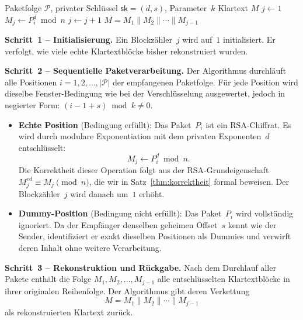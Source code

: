 ﻿\documentclass[12pt, a4paper]{article}
\theoremstyle{plain}
\theoremstyle{definition}
\theoremstyle{remark}
\newcommand{\sk}{\mathsf{sk}}
\begin{document}
\begin{algorithm}[h]
\caption{Fenster-Chiffre: Entschl\"usselung}
\label{alg:dec}
\begin{algorithmic}[1]
\Require Paketfolge $\mathcal{P}$, privater Schl\"ussel $\sk=(d,s)$, Parameter~$k$
\Ensure Klartext $M$
\State $j \gets 1$
    \State $M_j \gets P_i^d \bmod n$
    \State $j \gets j + 1$
  \EndIf
\EndFor
\State \Return $M = M_1 \| M_2 \| \cdots \| M_{j-1}$
\end{algorithmic}
\end{algorithm}

\medskip
\noindent\textbf{Schritt~1 -- Initialisierung.}
Ein Blockz\"ahler~$j$ wird auf~$1$ initialisiert. Er verfolgt, wie viele
echte Klartextbl\"ocke bisher rekonstruiert wurden.

\medskip
\noindent\textbf{Schritt~2 -- Sequentielle Paketverarbeitung.}
Der Algorithmus durchl\"auft alle Positionen $i = 1, 2, \ldots, |\mathcal{P}|$
der empfangenen Paketfolge. F\"ur jede Position wird dieselbe
Fenster-Bedingung wie bei der Verschl\"usselung ausgewertet, jedoch in
negierter Form: $(i - 1 + s) \bmod k \neq 0$.

\begin{itemize}
  \item \textbf{Echte Position} (Bedingung erf\"ullt): Das Paket~$P_i$ ist
  ein RSA-Chiffrat. Es wird durch modulare Exponentiation mit dem privaten
  Exponenten~$d$ entschl\"usselt:
  \[
    M_j \gets P_i^d \bmod n.
  \]
  Die Korrektheit dieser Operation folgt aus der RSA-Grundeigenschaft
  $M_j^{ed} \equiv M_j \pmod{n}$, die wir in Satz~\ref{thm:korrektheit}
  formal beweisen. Der Blockz\"ahler~$j$ wird danach um~$1$ erh\"oht.

  \item \textbf{Dummy-Position} (Bedingung nicht erf\"ullt): Das Paket~$P_i$
  wird vollst\"andig ignoriert. Da der Empf\"anger denselben geheimen
  Offset~$s$ kennt wie der Sender, identifiziert er exakt dieselben
  Positionen als Dummies und verwirft deren Inhalt ohne weitere Verarbeitung.
\end{itemize}

\medskip
\noindent\textbf{Schritt~3 -- Rekonstruktion und R\"uckgabe.}
Nach dem Durchlauf aller Pakete enth\"alt die Folge $M_1, M_2, \ldots, M_{j-1}$
alle entschl\"usselten Klartextbl\"ocke in ihrer originalen Reihenfolge.
Der Algorithmus gibt deren Verkettung
\[
  M = M_1 \| M_2 \| \cdots \| M_{j-1}
\]
als rekonstruierten Klartext zur\"uck.
\end{document}
